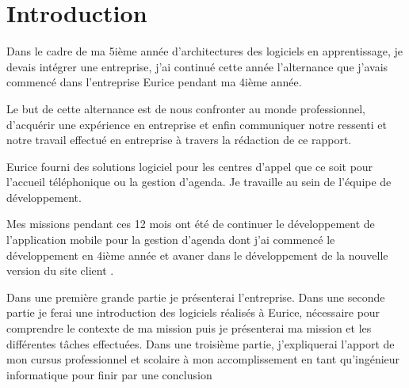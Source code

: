 \chapter*{Introduction}
Dans le cadre de ma 5ième année d'architectures des logiciels en apprentissage, 
je devais intégrer une entreprise, j'ai continué cette année l'alternance que j'avais commencé 
dans l'entreprise Eurice pendant ma 4ième année.\newline

Le but de cette alternance est de nous confronter au monde professionnel, 
d’acquérir une expérience en entreprise et enfin communiquer notre ressenti et 
notre travail effectué en entreprise à travers la rédaction de ce rapport. \newline

Eurice fourni des solutions logiciel pour les centres d'appel 
que ce soit pour l'accueil téléphonique ou la gestion d'agenda. 
Je travaille au sein de l’équipe de développement. 

Mes missions pendant ces 12 mois ont été de continuer le développement de l'application mobile pour la gestion d'agenda
dont j'ai commencé le développement en 4ième année et avaner dans le développement de la nouvelle version du site client . \newline

Dans une première grande partie je présenterai l’entreprise. 
Dans une seconde partie je ferai une introduction des logiciels réalisés à Eurice, 
nécessaire pour comprendre le contexte de ma mission 
puis je présenterai ma mission et les différentes tâches effectuées.
Dans une troisième partie, j'expliquerai l'apport de mon cursus professionnel et scolaire à mon accomplissement
en tant qu'ingénieur informatique pour finir par une conclusion \newline


